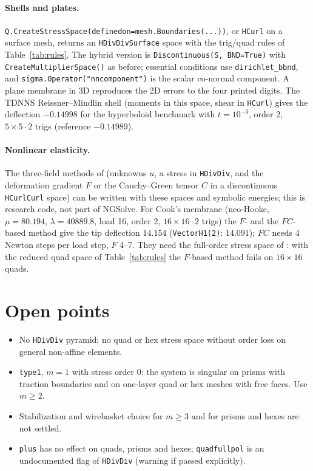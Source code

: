 \documentclass[10pt,a4paper]{article}
\newcommand{\code}[1]{\texttt{#1}}
\begin{document}
\paragraph{Shells and plates.}
\code{Q.CreateStressSpace(definedon=mesh.Boundaries(...))}, or \code{HCurl} on a surface mesh, returns an \code{HDivDivSurface} space with the trig/quad rules of Table~\ref{tab:rules}. The hybrid version is \code{Discontinuous(S, BND=True)} with \code{CreateMultiplierSpace()} as before; essential conditions use \code{dirichlet\_bbnd}, and \code{sigma.Operator("nncomponent")} is the scalar co-normal component. A plane membrane in 3D reproduces the 2D errors to the four printed digits. The TDNNS Reissner--Mindlin shell (moments in this space, shear in \code{HCurl}) gives the deflection $-0.14998$ for the hyperboloid benchmark with $t=10^{-3}$, order 2, $5\times5\cdot2$ trigs (reference $-0.14989$).

\paragraph{Nonlinear elasticity.}
The three-field methods of \cite{nps21} (unknowns $u$, a stress in \code{HDivDiv}, and the deformation gradient $F$ or the Cauchy--Green tensor $C$ in a discontinuous \code{HCurlCurl} space) can be written with these spaces and symbolic energies; this is research code, not part of NGSolve. For Cook's membrane (neo-Hooke, $\mu=80.194$, $\lambda=40889.8$, load 16, order 2, $16\times16\cdot2$ trigs) the $F$- and the $FC$-based method give the tip deflection $14.154$ (\code{VectorH1(2)}: $14.091$); $FC$ needs 4 Newton steps per load step, $F$ 4--7. They need the full-order stress space of \cite{nps21}: with the reduced quad space of Table~\ref{tab:rules} the $F$-based method fails on $16\times16$ quads.

\section{Open points}
\begin{itemize}\setlength\itemsep{1pt}
\item No \code{HDivDiv} pyramid; no quad or hex stress space without order loss on general non-affine elements.
\item \code{type1}, $m=1$ with stress order 0: the system is singular on prisms with traction boundaries and on one-layer quad or hex meshes with free faces. Use $m\ge2$.
\item Stabilization and wirebasket choice for $m\ge3$ and for prisms and hexes are not settled.
\item \code{plus} has no effect on quads, prisms and hexes; \code{quadfullpol} is an undocumented flag of \code{HDivDiv} (warning if passed explicitly).
\end{itemize}
\end{document}
